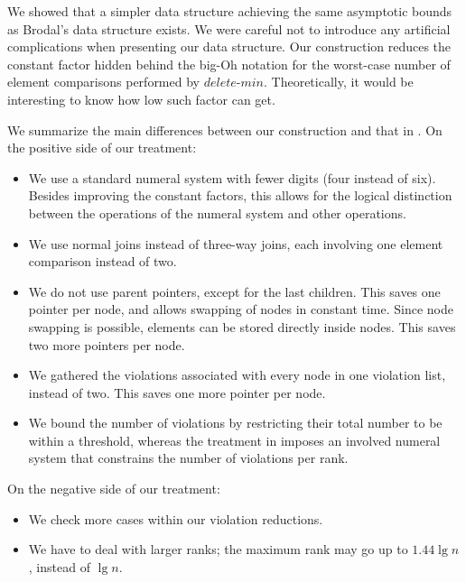 \documentclass{llncs}
\newcommand{\Deletemin}{\mbox{$\mathit{delete}$\mbox{\rm -}$\mathit{min}$}}
\begin{document}
We showed that a simpler data structure achieving the same asymptotic
bounds as Brodal's data structure \cite{Bro96} exists.  We were
careful not to introduce any artificial complications when presenting
our data structure.  Our construction reduces the constant factor
hidden behind the big-Oh notation for the worst-case number of element
comparisons performed by \Deletemin{}.  Theoretically, it would be
interesting to know how low such factor can get.

We summarize the main differences between our construction and that in
\cite{Bro96}.  On the positive side of our treatment:
\begin{itemize}

\item We use a standard numeral system with fewer digits (four instead
  of six).  Besides improving the constant factors, this allows for
  the logical distinction between the operations of
  the numeral system and other operations.

\item We use normal joins instead of three-way joins, each involving
  one element comparison instead of two.

\item We do not use parent pointers, except for the last children.
  This saves one pointer per node, and allows swapping of nodes in
  constant time. Since node swapping is possible, elements can be
  stored directly inside nodes. This saves two more pointers per node.

\item We gathered the violations associated with every node in one
  violation list, instead of two. This saves one more pointer per node.

\item We bound the number of violations by restricting their total
  number to be within a threshold, whereas the treatment
  in \cite{Bro96} imposes an involved numeral system that constrains
  the number of violations per rank.

\end{itemize}
\noindent
On the negative side of our treatment:
\begin{itemize}
\item We check more cases within our violation reductions.

\item We have to deal with larger ranks; the maximum rank may go up to
  $1.44 \lg n$, instead of $\lg n$.
\end{itemize}  
\end{document}

